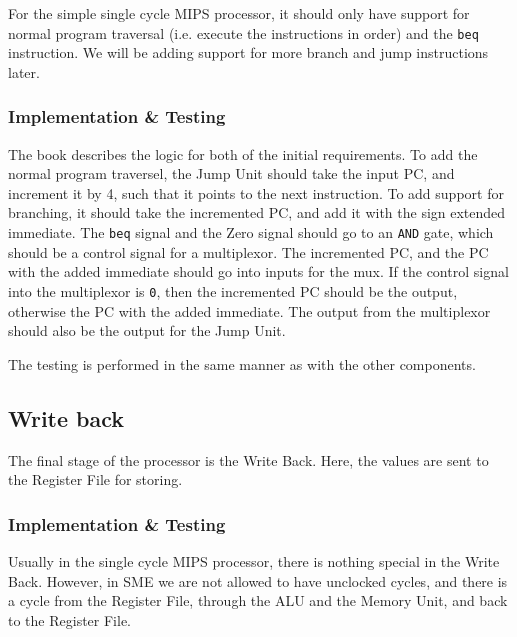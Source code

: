 For the simple single cycle MIPS processor, it should only have support for
normal program traversal (i.e. execute the instructions in order) and the
\texttt{beq} instruction. We will be adding support for more branch and jump
instructions later.

\subsubsection*{Implementation \& Testing}
The book describes the logic for both of the initial requirements. To add the
normal program traversel, the Jump Unit should take the input PC, and increment
it by 4, such that it points to the next instruction. To add support for
branching, it should take the incremented PC, and add it with the sign extended
immediate. The \texttt{beq} signal and the Zero signal should go to an
\texttt{AND} gate, which should be a control signal for a multiplexor. The
incremented PC, and the PC with the added immediate should go into inputs for
the mux. If the control signal into the multiplexor is \texttt{0}, then the
incremented PC should be the output, otherwise the PC with the added immediate.
The output from the multiplexor should also be the output for the Jump Unit.

The testing is performed in the same manner as with the other components.

\subsection{Write back}
The final stage of the processor is the Write Back. Here, the values are sent
to the Register File for storing.

\subsubsection*{Implementation \& Testing}
Usually in the single cycle MIPS processor, there is nothing special in the
Write Back. However, in SME we are not allowed to have unclocked cycles, and
there is a cycle from the Register File, through the ALU and the Memory Unit,
and back to the Register File.

